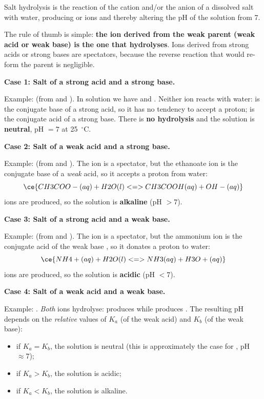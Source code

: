 \documentclass[11pt]{article}
\newcommand{\cle}[1]{{\popxbold\color{popdark}#1}}
\begin{document}
\begin{definition}
\cle{Salt hydrolysis} is the reaction of the cation and/or the anion of a dissolved salt with water, producing  or  ions and thereby altering the pH of the solution from 7.
\end{definition}

The rule of thumb is simple: \textbf{the ion derived from the weak parent (weak acid or weak base) is the one that hydrolyses}. Ions derived from strong acids or strong bases are spectators, because the reverse reaction that would re-form the parent is negligible.

\textbf{Case 1: Salt of a strong acid and a strong base.}\par
Example:  (from  and ). In solution we have  and . Neither ion reacts with water:  is the conjugate base of a strong acid, so it has no tendency to accept a proton;  is the conjugate acid of a strong base. There is \textbf{no hydrolysis} and the solution is \textbf{neutral}, pH $= 7$ at \SI{25}{\ensuremath{{}^{\circ}\mathrm{C}}}.

\textbf{Case 2: Salt of a weak acid and a strong base.}\par
Example:  (from  and ). The  ion is a spectator, but the ethanoate ion is the conjugate base of a \emph{weak} acid, so it accepts a proton from water:
\[
\ce{CH3COO-(aq) + H2O(l) <=> CH3COOH(aq) + OH-(aq)}
\]
 ions are produced, so the solution is \textbf{alkaline} (pH $> 7$).

\textbf{Case 3: Salt of a strong acid and a weak base.}\par
Example:  (from  and ). The  ion is a spectator, but the ammonium ion is the conjugate acid of the weak base , so it donates a proton to water:
\[
\ce{NH4+(aq) + H2O(l) <=> NH3(aq) + H3O+(aq)}
\]
 ions are produced, so the solution is \textbf{acidic} (pH $< 7$).

\textbf{Case 4: Salt of a weak acid and a weak base.}\par
Example: . \emph{Both} ions hydrolyse:  produces  while  produces . The resulting pH depends on the \emph{relative} values of $K_a$ (of the weak acid) and $K_b$ (of the weak base):
\begin{itemize}
\item if $K_a = K_b$, the solution is neutral (this is approximately the case for , pH $\approx 7$);
\item if $K_a > K_b$, the solution is acidic;
\item if $K_a < K_b$, the solution is alkaline.
\end{itemize}
\end{document}
